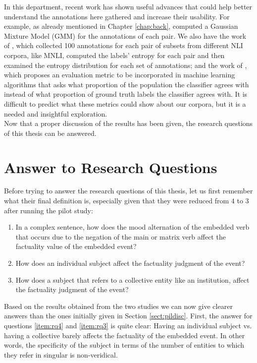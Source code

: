 In this department, recent work has shown useful advances that could help better understand the annotations here gathered and increase their usability. For example, as already mentioned in Chapter \ref{chap:back}, \citet{pavlick2019inherent} computed a Gaussian Mixture Model (GMM) for the annotations of each pair. We also have the work of \citet{nie2020can}, which collected 100 annotations for each pair of subsets from different NLI corpora, like MNLI, computed the labels' entropy for each pair and then examined the entropy distribution for each set of annotations; and the work of \citet{gordon2021disagreement}, which proposes an evaluation metric to be incorporated in machine learning algorithms that asks what proportion of the population the classifier agrees with instead of what proportion of ground truth labels the classifier agrees with. It is difficult to predict what these metrics could show about our corpora, but it is a needed and insightful exploration. \\

Now that a proper discussion of the results has been given, the research questions of this thesis can be answered.\\

\section{Answer to Research Questions}
Before trying to answer the research questions of this thesis, let us first remember what their final definition is, especially given that they were reduced from $4$ to $3$ after running the pilot study:\\

\begin{enumerate}[RQ1.-]
        \item In a complex sentence, how does the mood alternation of the embedded verb that occurs due to the negation of the main or matrix verb affect the factuality value of the embedded event?\label{item:rq1}
        \item How does an individual subject affect the factuality judgment of the event?\label{item:rq3}
        \item How does a subject that refers to a collective entity like an institution, affect the factuality judgment of the event?\label{item:rq4}
\end{enumerate}

Based on the results obtained from the two studies we can now give clearer answers than the ones initially given in Section \ref{sect:pildisc}. First, the answer for questions \ref{item:rq4} and \ref{item:rq3} is quite clear: Having an individual subject vs. having a collective barely affects the factuality of the embedded event. In other words, the specificity of the subject in terms of the number of entities to which they refer in singular is non-veridical.\\

